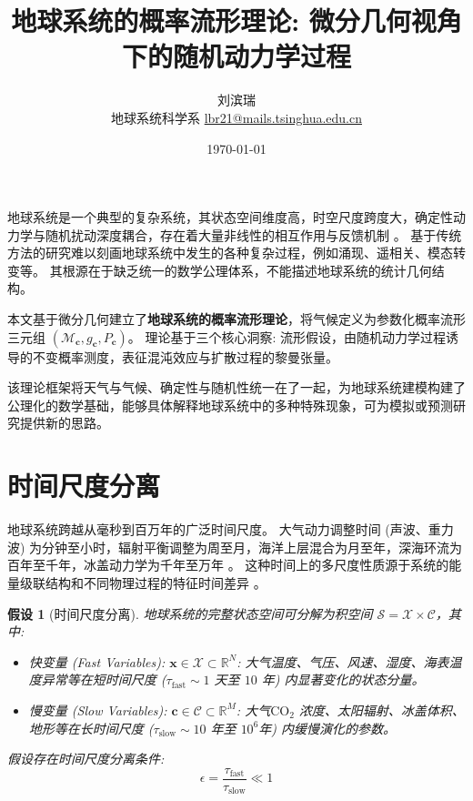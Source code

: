 \documentclass[12pt, a4paper]{article}
\title{\Large\textbf{地球系统的概率流形理论: 微分几何视角下的随机动力学过程}}
\author{刘滨瑞 \\ 地球系统科学系 \quad \href{mailto:lbr21@mails.tsinghua.edu.cn}{lbr21@mails.tsinghua.edu.cn}}
\date{\today}
\newtheorem{assumption}{假设}[section]
\newcommand{\R}{\mathbb{R}}
\newcommand{\manifold}{\mathcal{M}}
\newcommand{\metric}{g}
\newcommand{\dataspace}{\mathcal{X}}
\newcommand{\climatespace}{\mathcal{C}}
\newcommand{\measure}{P}
\newcommand{\fastvar}{\bm{x}}          %
\newcommand{\slowvar}{\bm{c}}          %
\newcommand{\statespace}{\mathcal{S}}  %
\newcommand{\predtime}{\tau}      %
\begin{document}
\maketitle

地球系统是一个典型的复杂系统，其状态空间维度高，时空尺度跨度大，确定性动力学与随机扰动深度耦合，存在着大量非线性的相互作用与反馈机制 \cite{wang2023earth}。
基于传统方法的研究难以刻画地球系统中发生的各种复杂过程，例如涌现、遥相关、模态转变等。
其根源在于缺乏统一的数学公理体系，不能描述地球系统的统计几何结构。

本文基于微分几何建立了\textbf{地球系统的概率流形理论}，将气候定义为参数化概率流形三元组 $(\manifold_{\slowvar}, \metric_{\slowvar}, \measure_{\slowvar})$。
理论基于三个核心洞察: 流形假设，由随机动力学过程诱导的不变概率测度，表征混沌效应与扩散过程的黎曼张量。

该理论框架将天气与气候、确定性与随机性统一在了一起，为地球系统建模构建了公理化的数学基础，能够具体解释地球系统中的多种特殊现象，可为模拟或预测研究提供新的思路。



\section{时间尺度分离}

地球系统跨越从毫秒到百万年的广泛时间尺度。
大气动力调整时间 (声波、重力波) 为分钟至小时，辐射平衡调整为周至月，海洋上层混合为月至年，深海环流为百年至千年，冰盖动力学为千年至万年 \cite{majda2012climate}。
这种时间上的多尺度性质源于系统的能量级联结构和不同物理过程的特征时间差异 \cite{arnold1998random}。

\begin{assumption}[时间尺度分离]
\label{ass:timescale_separation}
    地球系统的完整状态空间可分解为积空间 $\statespace = \dataspace \times \climatespace$，其中:
    \begin{itemize}
        \item 快变量 (Fast Variables): $\fastvar \in \dataspace \subset \R^N$: 大气温度、气压、风速、湿度、海表温度异常等在短时间尺度 ($\predtime_{\text{fast}} \sim 1$ 天至 $10$ 年) 内显著变化的状态分量。
        \item 慢变量 (Slow Variables): $\slowvar \in \climatespace \subset \R^M$: 大气$\text{CO}_2$ 浓度、太阳辐射、冰盖体积、地形等在长时间尺度 ($\predtime_{\text{slow}} \sim 10$ 年至 $10^6$年) 内缓慢演化的参数。
    \end{itemize}

    假设存在时间尺度分离条件:
    \begin{equation}
    \label{eq:timescale_separation}
        \epsilon = \frac{\predtime_{\text{fast}}}{\predtime_{\text{slow}}} \ll 1
    \end{equation}
\end{assumption}
\end{document}
